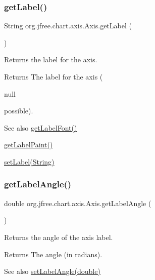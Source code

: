 \subsubsection{\texorpdfstring{get\+Label()}{getLabel()}}
{\footnotesize\ttfamily String org.\+jfree.\+chart.\+axis.\+Axis.\+get\+Label (\begin{DoxyParamCaption}{ }\end{DoxyParamCaption})}

Returns the label for the axis.

\begin{DoxyReturn}{Returns}
The label for the axis (
\begin{DoxyCode}
null 
\end{DoxyCode}
 possible).
\end{DoxyReturn}
\begin{DoxySeeAlso}{See also}
\mbox{\hyperlink{classorg_1_1jfree_1_1chart_1_1axis_1_1_axis_a8aa271547c74cba1a28e26068828ef0e}{get\+Label\+Font()}} 

\mbox{\hyperlink{classorg_1_1jfree_1_1chart_1_1axis_1_1_axis_a81988e297d1403bfb05c2d0ba038cac5}{get\+Label\+Paint()}} 

\mbox{\hyperlink{classorg_1_1jfree_1_1chart_1_1axis_1_1_axis_a645aa69b1907aa460a92e08a126c6d79}{set\+Label(\+String)}} 
\end{DoxySeeAlso}
\mbox{\label{classorg_1_1jfree_1_1chart_1_1axis_1_1_axis_a51cf668dba1c051f7c59e82668618f33}} 
\subsubsection{\texorpdfstring{get\+Label\+Angle()}{getLabelAngle()}}
{\footnotesize\ttfamily double org.\+jfree.\+chart.\+axis.\+Axis.\+get\+Label\+Angle (\begin{DoxyParamCaption}{ }\end{DoxyParamCaption})}

Returns the angle of the axis label.

\begin{DoxyReturn}{Returns}
The angle (in radians).
\end{DoxyReturn}
\begin{DoxySeeAlso}{See also}
\mbox{\hyperlink{classorg_1_1jfree_1_1chart_1_1axis_1_1_axis_a5f748a1d2aabe0b3f72120fbd7c9d28c}{set\+Label\+Angle(double)}} 
\end{DoxySeeAlso}
\mbox{\label{classorg_1_1jfree_1_1chart_1_1axis_1_1_axis_a2c1b6ffdcab95dd0f36cd1d2f195b1bc}} 

